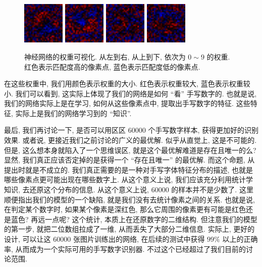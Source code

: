 \documentclass{ctexart}
\begin{document}
\begin{figure}
    \includegraphics[width=0.18\textwidth]{images/weight-6.png}
    \includegraphics[width=0.18\textwidth]{images/weight-7.png}
    \includegraphics[width=0.18\textwidth]{images/weight-8.png}
    \includegraphics[width=0.18\textwidth]{images/weight-9.png}
    \caption{神经网络的权重可视化. 从左到右, 从上到下, 依次为 $0 \sim 9$ 的权重. 
    红色表示匹配度高的像素点, 蓝色表示匹配度低的像素点.}
\end{figure}

在这些权重中, 我们用颜色表示权重的大小. 红色表示权重较大, 蓝色表示权重较小. 我们可以看到,
这实际上体现了我们的网络是如何 ``看'' 手写数字的. 也就是说, 我们的网络实际上是在学习,
如何从这些像素点中, 提取出手写数字的特征. 这些特征, 实际上是我们的网络学习到的 ``知识''.

最后, 我们再讨论一下, 是否可以用区区 $60000$ 个手写数字样本, 获得更加好的识别效果. 或者说, 
更接近我们之前讨论的广义的最优解. 似乎从直觉上, 这是不可能的. 但是, 
这么想本身就陷入了一个思维误区, 就是这个最优解难道是存在且唯一的么? 显然, 
我们真正应该否定掉的是获得一个  ``存在且唯一'' 的最优解. 而这个命题, 从提出时就是不成立的.
我们真正需要的是一种对手写字体特征分布的描述, 也就是哪些像素点更可能出现在哪些数字上. 
从这个意义上说, 我们应该充分利用统计学知识, 去还原这个分布的信息. 从这个意义上说, 
$60000$ 的样本并不是少数了. 这里顺便指出我们的模型的一个缺陷, 就是我们没有去统计像素之间的关系.
也就是说, 在判定某个数字时, 如果某个像素是深红色, 那么它周围的像素更有可能是红色还是蓝色? 再远一点呢?
这个统计, 本质上在还原数字的二维结构. 但注意我们的模型的第一步, 就把二位数组拉成了一维, 
从而丢失了大部分二维信息. 实际上, 更好的设计, 可以让这 $60000$ 张图片训练出的网络, 
在后续的测试中获得 $99\%$ 以上的正确率, 从而成为一个实际可用的手写数字识别器. 
不过这个已经超过了我们目前的讨论范围.



\end{document}
